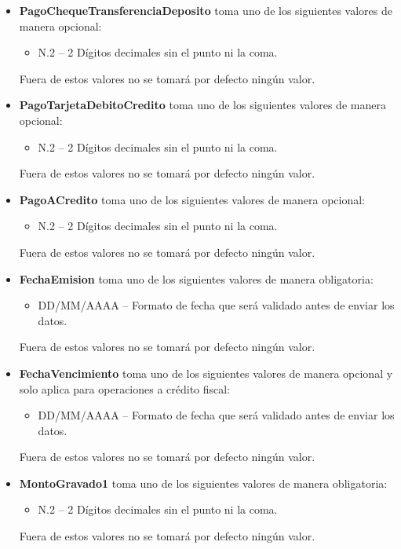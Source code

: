 \documentclass{article}
\begin{document}
\begin{itemize}
    \item \textbf{PagoChequeTransferenciaDeposito} toma uno de los siguientes valores de manera opcional:
    \begin{itemize}
        \item N.2 – 2 Dígitos decimales sin el punto ni la coma.
    \end{itemize}
    Fuera de estos valores no se tomará por defecto ningún valor.

    \item \textbf{PagoTarjetaDebitoCredito} toma uno de los siguientes valores de manera opcional:
    \begin{itemize}
        \item N.2 – 2 Dígitos decimales sin el punto ni la coma.
    \end{itemize}
    Fuera de estos valores no se tomará por defecto ningún valor.

    \item \textbf{PagoACredito} toma uno de los siguientes valores de manera opcional:
    \begin{itemize}
        \item N.2 – 2 Dígitos decimales sin el punto ni la coma.
    \end{itemize}
    Fuera de estos valores no se tomará por defecto ningún valor.

    \item \textbf{FechaEmision} toma uno de los siguientes valores de manera obligatoria:
    \begin{itemize}
        \item DD/MM/AAAA – Formato de fecha que será validado antes de enviar los datos.
    \end{itemize}
    Fuera de estos valores no se tomará por defecto ningún valor.

    \item \textbf{FechaVencimiento} toma uno de los siguientes valores de manera opcional y solo aplica para operaciones a crédito fiscal:
    \begin{itemize}
        \item DD/MM/AAAA – Formato de fecha que será validado antes de enviar los datos.
    \end{itemize}
    Fuera de estos valores no se tomará por defecto ningún valor.

    \item \textbf{MontoGravado1} toma uno de los siguientes valores de manera obligatoria:
    \begin{itemize}
        \item N.2 – 2 Dígitos decimales sin el punto ni la coma.
    \end{itemize}
    Fuera de estos valores no se tomará por defecto ningún valor.


\end{itemize}
\end{document}
